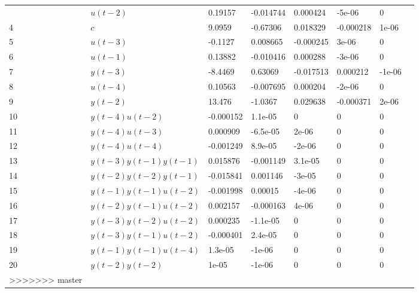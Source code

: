 \begin{tabular}{llllllll}
\begin{tabular}{lllllll}
3 & $u(t-2)$ & 0.19157 & -0.014744 & 0.000424 & -5e-06 & 0 \\ 
4 & $c$ & 9.0959 & -0.67306 & 0.018329 & -0.000218 & 1e-06 \\ 
5 & $u(t-3)$ & -0.1127 & 0.008665 & -0.000245 & 3e-06 & 0 \\ 
6 & $u(t-1)$ & 0.13882 & -0.010416 & 0.000288 & -3e-06 & 0 \\ 
7 & $y(t-3)$ & -8.4469 & 0.63069 & -0.017513 & 0.000212 & -1e-06 \\ 
8 & $u(t-4)$ & 0.10563 & -0.007695 & 0.000204 & -2e-06 & 0 \\ 
9 & $y(t-2)$ & 13.476 & -1.0367 & 0.029638 & -0.000371 & 2e-06 \\ 
10 & $y(t-4)u(t-2)$ & -0.000152 & 1.1e-05 & 0 & 0 & 0 \\ 
11 & $y(t-4)u(t-3)$ & 0.000909 & -6.5e-05 & 2e-06 & 0 & 0 \\ 
12 & $y(t-4)u(t-4)$ & -0.001249 & 8.9e-05 & -2e-06 & 0 & 0 \\ 
13 & $y(t-3)y(t-1)y(t-1)$ & 0.015876 & -0.001149 & 3.1e-05 & 0 & 0 \\ 
14 & $y(t-2)y(t-2)y(t-1)$ & -0.015841 & 0.001146 & -3e-05 & 0 & 0 \\ 
15 & $y(t-1)y(t-1)u(t-2)$ & -0.001998 & 0.00015 & -4e-06 & 0 & 0 \\ 
16 & $y(t-2)y(t-1)u(t-2)$ & 0.002157 & -0.000163 & 4e-06 & 0 & 0 \\ 
17 & $y(t-3)y(t-2)u(t-2)$ & 0.000235 & -1.1e-05 & 0 & 0 & 0 \\ 
18 & $y(t-3)y(t-1)u(t-2)$ & -0.000401 & 2.4e-05 & 0 & 0 & 0 \\ 
19 & $y(t-1)y(t-1)u(t-4)$ & 1.3e-05 & -1e-06 & 0 & 0 & 0 \\ 
20 & $y(t-2)y(t-2)$ & 1e-05 & -1e-06 & 0 & 0 & 0 \\ 
>>>>>>> master
\hline 
\end{tabular}